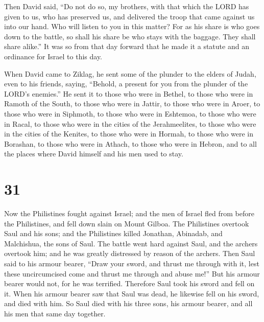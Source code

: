  Then David said, ``Do not do so, my brothers, with that
which the LORD has given to us, who has preserved us, and delivered the
troop that came against us into our hand.  Who will
listen to you in this matter? For as his share is who goes down to the
battle, so shall his share be who stays with the baggage. They shall
share alike.''  It was so from that day forward that he
made it a statute and an ordinance for Israel to this day.

 When David came to Ziklag, he sent some of the plunder
to the elders of Judah, even to his friends, saying, ``Behold, a present
for you from the plunder of the LORD's enemies.''  He
sent it to those who were in Bethel, to those who were in Ramoth of the
South, to those who were in Jattir,  to those who were in
Aroer, to those who were in Siphmoth, to those who were in Eshtemoa,
 to those who were in Racal, to those who were in the
cities of the Jerahmeelites, to those who were in the cities of the
Kenites,  to those who were in Hormah, to those who were
in Borashan, to those who were in Athach,  to those who
were in Hebron, and to all the places where David himself and his men
used to stay.

\hypertarget{section-30}{%
\section{31}\label{section-30}}

 Now the Philistines fought against Israel; and the men of
Israel fled from before the Philistines, and fell down slain on Mount
Gilboa.  The Philistines overtook Saul and his sons; and
the Philistines killed Jonathan, Abinadab, and Malchishua, the sons of
Saul.  The battle went hard against Saul, and the archers
overtook him; and he was greatly distressed by reason of the archers.
 Then Saul said to his armour bearer, ``Draw your sword,
and thrust me through with it, lest these uncircumcised come and thrust
me through and abuse me!'' But his armour bearer would not, for he was
terrified. Therefore Saul took his sword and fell on it. 
When his armour bearer saw that Saul was dead, he likewise fell on his
sword, and died with him.  So Saul died with his three
sons, his armour bearer, and all his men that same day together.

